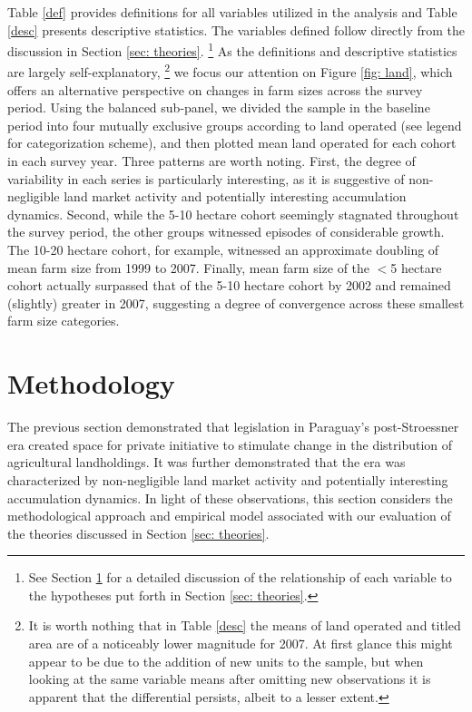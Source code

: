 \documentclass[english]{article}
\begin{document}
Table \ref{def} provides definitions for all variables utilized in the analysis 
and Table \ref{desc} presents descriptive statistics. 
The variables defined follow directly from the discussion in Section 
\ref{sec: theories}.%
\footnote{See Section \ref{sec: methodology} for a detailed 
discussion of the relationship of each variable to the hypotheses
put forth in Section \ref{sec: theories}.}
As the definitions and descriptive statistics are largely self-explanatory,%
\footnote{It is worth nothing that in Table \ref{desc} the means of land 
operated and titled area are of a noticeably lower magnitude for 2007. 
At first glance this might appear to be due to the addition of new units to the 
sample, but when looking at the same variable means after omitting new 
observations it is apparent that the differential persists, albeit to a lesser 
extent.}
we focus our attention on Figure \ref{fig: land}, which offers an alternative 
perspective on changes in farm sizes across the survey period.
Using the balanced sub-panel, we divided the sample in the baseline period 
into four mutually exclusive groups according to land operated (see legend for 
categorization scheme), and then plotted mean land operated for each cohort 
in each survey year.
Three patterns are worth noting.
First, the degree of variability in each series is particularly interesting, as it is 
suggestive of non-negligible land market activity and potentially interesting
accumulation dynamics.
Second, while the 5-10 hectare cohort seemingly stagnated throughout the 
survey period, the other groups witnessed episodes of considerable growth.
The 10-20 hectare cohort, for example, witnessed an approximate doubling of 
mean farm size from 1999 to 2007.
Finally, mean farm size of the $<$5 hectare cohort actually surpassed that of 
the 5-10 hectare cohort by 2002 and remained (slightly) greater in 2007, 
suggesting a degree of convergence across these smallest farm size 
categories.


\section{Methodology}
\label{sec: methodology}

The previous section demonstrated that legislation in Paraguay's 
post-Stroessner era created space for private initiative to stimulate change in 
the distribution of agricultural landholdings.
It was further demonstrated that the era was characterized by non-negligible 
land market activity and potentially interesting accumulation dynamics.
In light of these observations, this section considers the methodological 
approach and empirical model associated with our evaluation of the 
theories discussed in Section \ref{sec: theories}.
\end{document}
